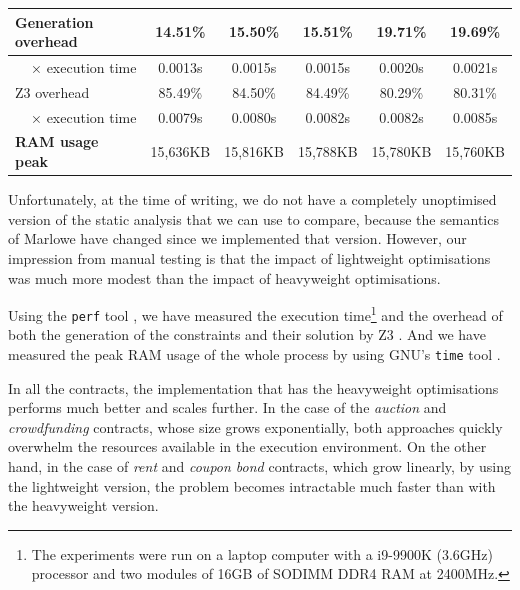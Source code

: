 \documentclass[english,runningheads]{llncs}
\begin{document}
\begin{table}[]
{\begin{tabular}{l||lllll}
Generation overhead                    & \multicolumn{1}{c|}{14.51\%}  & \multicolumn{1}{c|}{15.50\%}  & \multicolumn{1}{c|}{15.51\%}  & \multicolumn{1}{c|}{19.71\%}  & \multicolumn{1}{c}{19.69\%} \\ \hline
\multicolumn{1}{r||}{× execution time} & \multicolumn{1}{c|}{0.0013s}  & \multicolumn{1}{c|}{0.0015s}  & \multicolumn{1}{c|}{0.0015s}  & \multicolumn{1}{c|}{0.0020s}  & \multicolumn{1}{c}{0.0021s} \\ \hline
Z3 overhead                            & \multicolumn{1}{c|}{85.49\%}  & \multicolumn{1}{c|}{84.50\%}  & \multicolumn{1}{c|}{84.49\%}  & \multicolumn{1}{c|}{80.29\%}  & \multicolumn{1}{c}{80.31\%} \\ \hline
\multicolumn{1}{r||}{× execution time} & \multicolumn{1}{c|}{0.0079s}  & \multicolumn{1}{c|}{0.0080s}  & \multicolumn{1}{c|}{0.0082s}  & \multicolumn{1}{c|}{0.0082s}  & \multicolumn{1}{c}{0.0085s} \\ \hline
\textbf{RAM usage peak}                & \multicolumn{1}{c|}{15,636KB} & \multicolumn{1}{c|}{15,816KB} & \multicolumn{1}{c|}{15,788KB} & \multicolumn{1}{c|}{15,780KB} & \multicolumn{1}{c}{15,760KB}
\end{tabular}
}
\vspace*{-0.6cm}
\end{table}


\noindent
Unfortunately, at the time of writing, we do not have a completely unoptimised
version of the static analysis that we can use to compare, because the semantics
of Marlowe have changed since we implemented that version. However, our impression
from manual testing is that the impact of lightweight optimisations was much more modest than the impact of heavyweight optimisations.

Using the \texttt{perf} tool \cite{perf}, we have measured the execution
time\footnote{The experiments were run on a laptop computer with a
i9-9900K (3.6GHz) processor and two modules of 16GB of SODIMM DDR4 RAM at 2400MHz.}
and the overhead of both the generation of the constraints and their solution
by Z3 \cite{de2008z3}. And we have measured the peak RAM usage of the whole
process by using GNU's \texttt{time} tool \cite{keppel1998gnu}.

In all the contracts, the implementation that has the heavyweight optimisations
performs much better and scales further. In the case of the \textit{auction}
and \textit{crowdfunding} contracts, whose size grows exponentially, both
approaches quickly overwhelm the resources available in the execution environment.
On the other hand, in the case of \textit{rent} and \textit{coupon bond} contracts,
which grow linearly, by using the lightweight version, the problem becomes 
intractable much faster than with the heavyweight version.
\end{document}
